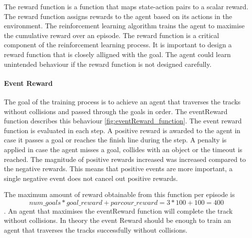 The reward function is a function that maps state-action pairs to a scalar reward. The reward function assigns rewards to the agent based on its actions in the environment. The reinforcement learning algorithm trains the agent to maximise the cumulative reward over an episode. The reward function is a critical component of the reinforcement learning process. It is important to design a reward function that is closely alligned with the goal. The agent could learn unintended behaviour if the reward function is not designed carefully.

\paragraph*{Event Reward}
The goal of the training process is to achieve an agent that traverses the tracks without collisions and passed through the goals in order. The eventReward function describes this behaviour \ref{fig:eventReward_function}. The event reward function is evaluated in each step. A positive reward is awarded to the agent in case it passes a goal or reaches the finish line during the step. A penalty is applied in case the agent misses a goal, collides with an object or the timeout is reached. The magnitude of positive rewards increased was increased compared to the negative rewards. This means that positive events are more important, a single negative event does not cancel out positive rewards.

The maximum amount of reward obtainable from this function per episode is \[num\_goals * goal\_reward + parcour\_reward = 3 * 100 + 100 = 400\]. An agent that maximises the eventReward function will complete the track without collisions. In theory the event Reward should be enough to train an agent that traverses the tracks successfully without collisions.


